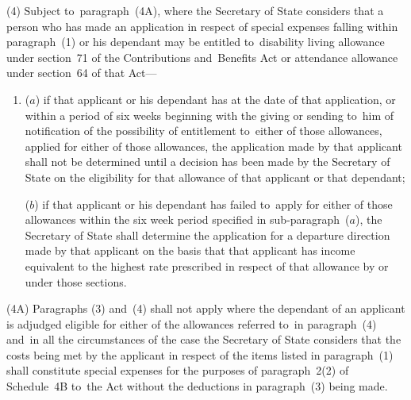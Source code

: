 \documentclass[12pt,a4paper]{article}
\begin{document}
(4) 
Subject to~paragraph~(4A),  %
where the Secretary of State considers that a person who has made an application in respect of special expenses falling within paragraph~(1) or his dependant may be entitled to~disability living allowance under section~71 of the Contributions and~Benefits Act or attendance allowance under section~64 of that Act—
\begin{enumerate}\item[]
($a$) if that applicant or his dependant has at the date of that application, or within a period of six weeks beginning with the giving or sending to~him of notification of the possibility of entitlement to~either of those allowances, applied for either of those allowances, the application made by that applicant shall not be determined until a decision has been made by the 
Secretary of State  %
on the eligibility for that allowance of that applicant or that dependant;

($b$) if that applicant or his dependant has failed to~apply for either of those
allowances within the six week period specified in sub-\hspace{0pt}paragraph~($a$), the
Secretary of State shall determine the application for a departure direction
made by that applicant on the basis that that applicant has income equivalent to
the highest rate prescribed in respect of that allowance by or under those
sections.
\end{enumerate}

(4A) Paragraphs (3) and~(4) shall not apply where the dependant of an applicant is adjudged eligible for either of the allowances referred to~in paragraph~(4) and~in all the circumstances of the case the Secretary of State considers that the costs being met by the applicant in respect of the items listed in paragraph~(1) shall constitute special expenses for the purposes of paragraph~2(2) of Schedule~4B to~the Act without the deductions in paragraph~(3) being made.
\end{document}
